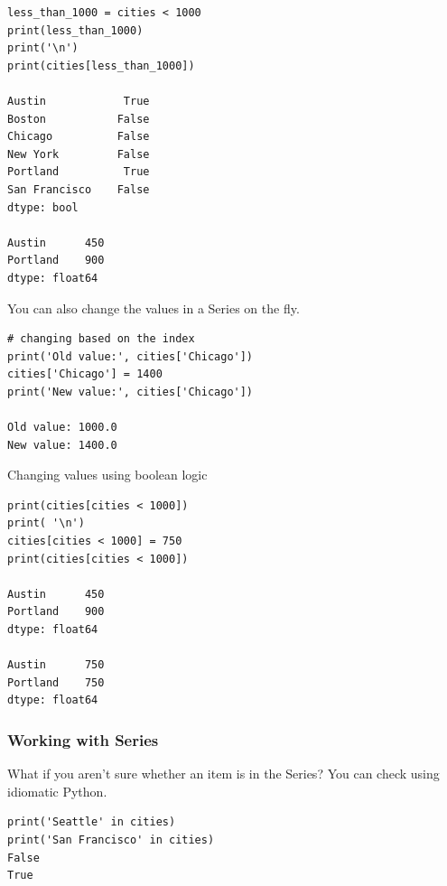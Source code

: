 
\begin{frame}[fragile]
\begin{lstlisting}
less_than_1000 = cities < 1000
print(less_than_1000)
print('\n')
print(cities[less_than_1000])

Austin            True
Boston           False
Chicago          False
New York         False
Portland          True
San Francisco    False
dtype: bool

Austin      450
Portland    900
dtype: float64
\end{lstlisting}
\end{frame}

\begin{frame}[fragile]
You can also change the values in a Series on the fly.
\begin{lstlisting}
# changing based on the index
print('Old value:', cities['Chicago'])
cities['Chicago'] = 1400
print('New value:', cities['Chicago'])

Old value: 1000.0
New value: 1400.0
\end{lstlisting}
\end{frame}

\begin{frame}[fragile]	
Changing values using boolean logic
\begin{lstlisting}
print(cities[cities < 1000])
print( '\n')
cities[cities < 1000] = 750
print(cities[cities < 1000])

Austin      450
Portland    900
dtype: float64

Austin      750
Portland    750
dtype: float64
\end{lstlisting}
\end{frame}

\begin{frame}[fragile]\frametitle{Working with Series}
What if you aren't sure whether an item is in the Series? You can check using idiomatic Python.
\begin{lstlisting}
print('Seattle' in cities)
print('San Francisco' in cities)
False
True
\end{lstlisting}
\end{frame}

